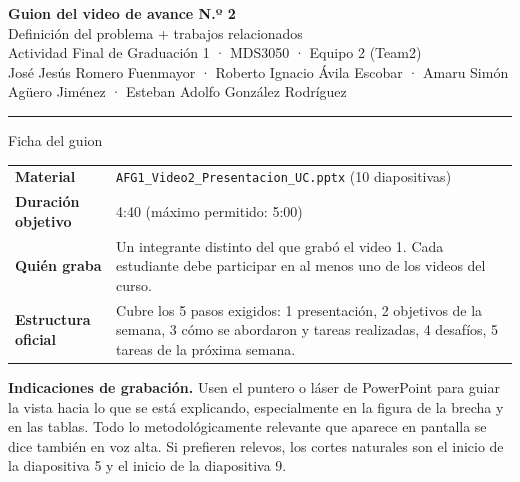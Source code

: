 




\begin{center}
{\color{azul}\LARGE\bfseries Guion del video de avance N.º 2}\\[0.15cm]
{\large Definición del problema + trabajos relacionados}\\[0.25cm]
{\color{tinta2}Actividad Final de Graduación 1 · MDS3050 · Equipo 2 (Team2)}\\
{\color{gris}\small José Jesús Romero Fuenmayor · Roberto Ignacio Ávila Escobar · Amaru Simón Agüero Jiménez · Esteban Adolfo González Rodríguez}\\[0.2cm]
{\color{azul}\rule{\textwidth}{0.8pt}}
\end{center}

\begin{ficha}{Ficha del guion}
\small
\begin{tabular}{@{}L{4.2cm}L{11.6cm}@{}}
\textbf{Material} & \texttt{AFG1\_Video2\_Presentacion\_UC.pptx} (10 diapositivas) \\
\textbf{Duración objetivo} & 4:40 (máximo permitido: 5:00) \\
\textbf{Quién graba} & Un integrante distinto del que grabó el video 1. Cada estudiante debe participar en al menos uno de los videos del curso. \\
\textbf{Estructura oficial} & Cubre los 5 pasos exigidos: 1 presentación, 2 objetivos de la semana, 3 cómo se abordaron y tareas realizadas, 4 desafíos, 5 tareas de la próxima semana. \\
\end{tabular}
\end{ficha}

\begin{nota}
\small \textbf{Indicaciones de grabación.} Usen el puntero o láser de PowerPoint para guiar la vista hacia lo que se está explicando, especialmente en la figura de la brecha y en las tablas. Todo lo metodológicamente relevante que aparece en pantalla se dice también en voz alta. Si prefieren relevos, los cortes naturales son el inicio de la diapositiva 5 y el inicio de la diapositiva 9.
\end{nota}

